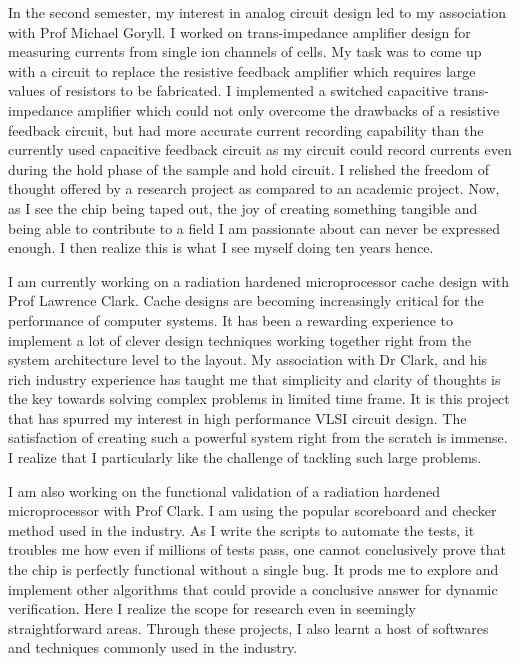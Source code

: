 \documentclass[letterpaper, 10pt]{article}
\begin{document}
In the second semester, my interest in analog circuit design led to my association with Prof Michael Goryll. I worked on trans-impedance amplifier design for measuring currents from single ion channels of cells. My task was to come up with a circuit to replace the resistive feedback amplifier which requires large values of resistors to be fabricated. I implemented a switched capacitive trans-impedance amplifier which could not only overcome the drawbacks of a resistive feedback circuit, but had more accurate current recording capability than the currently used capacitive feedback circuit as my circuit could record currents even during the hold phase of the sample and hold circuit. I relished the freedom of thought offered by a research project as compared to an academic project. Now, as I see the chip being taped out, the joy of creating something tangible and being able to contribute to a field I am passionate about can never be expressed enough. I then realize this is what I see myself doing ten years hence. 

I am currently working on a radiation hardened microprocessor cache design with Prof Lawrence Clark.  Cache designs are becoming increasingly critical for the performance of computer systems.  It has been a rewarding experience to implement a lot of clever design techniques working together right from the system architecture level to the layout. My association with Dr Clark, and his rich industry experience has taught me that simplicity and clarity of thoughts is the key towards solving complex problems in limited time frame. It is this project that has spurred my interest in high performance VLSI circuit design. The satisfaction of creating such a powerful system right from the scratch is immense.  I realize that I particularly like the challenge of tackling such large problems. 

I am also working on the functional validation of a radiation hardened microprocessor with Prof Clark. I am using the popular scoreboard and checker method used in the industry.  As I write the scripts to automate the tests,  it troubles me how even if millions of tests pass, one cannot conclusively prove that the chip is perfectly functional without a single bug. It prods me to explore and implement other algorithms that could provide a conclusive answer for dynamic verification.  Here I realize the scope for research even in seemingly straightforward areas.  Through these projects, I also learnt a host of softwares and techniques commonly used in the industry.
\end{document}
